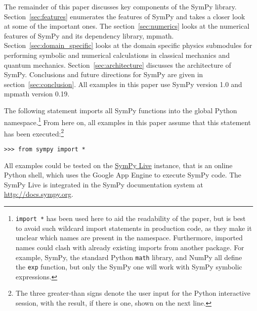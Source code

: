 The remainder of this paper discusses key components of the SymPy library.
Section~\ref{sec:features} enumerates the features of SymPy and takes a closer
look at some of the important ones. The section~\ref{sec:numerics} looks at
the numerical features of SymPy and its dependency library, mpmath.
Section~\ref{sec:domain_specific} looks at the domain specific physics
submodules for performing symbolic and numerical calculations in classical
mechanics and quantum mechanics. Section~\ref{sec:architecture} discusses the
architecture of SymPy. Conclusions and future directions for SymPy are given
in section~\ref{sec:conclusion}. All examples in this paper use SymPy version
1.0 and mpmath version 0.19.

The following statement imports all SymPy functions into the global Python
namespace.\footnote{\texttt{import *} has been used here to aid the
  readability of the paper, but is best to avoid such wildcard import
  statements in production code, as they make it unclear which names are
  present in the namespace. Furthermore, imported names could clash with
  already existing imports from another package. For example, SymPy, the
  standard Python \texttt{math} library, and NumPy all define the \texttt{exp}
  function, but only the SymPy one will work with SymPy symbolic expressions.}
From here on, all examples in this paper assume that this statement has been
executed:\footnote{\label{note:prompt} The three greater-than signs denote the user input for the
  Python interactive session, with the result, if there is one, shown on the
  next line.}

\begin{verbatim}
>>> from sympy import *
\end{verbatim}

All examples could be tested on the \href{http://live.sympy.org}{SymPy Live}
instance, that is an online Python shell, which uses the Google App Engine to
execute SymPy code.  The SymPy Live is integrated in the SymPy documentation
system at \href{http://docs.sympy.org}{http://docs.sympy.org}.
